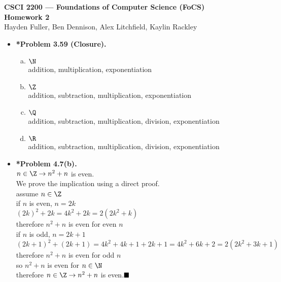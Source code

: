 \documentclass[11pt]{article}
\def\imp{\rightarrow}
\begin{document}
\thispagestyle{empty}   %

\begin{center}
\large
\textbf{CSCI 2200 --- Foundations of Computer Science (FoCS) \\
Homework 2}
\\Hayden Fuller, Ben Dennison, Alex Litchfield, Kaylin Rackley
\end{center}

\begin{itemize}

\item \textbf{*Problem 3.59 (Closure).} 
\begin{enumerate}[(a)]
\item $\N$
\\addition, multiplication, exponentiation
\item $\Z$
\\addition, subtraction, multiplication, exponentiation
\item $\Q$
\\addition, subtraction, multiplication, division, exponentiation
\item $\R$
\\addition, subtraction, multiplication, division, exponentiation
\end{enumerate}

\vspace{0.1in}

\item \textbf{*Problem 4.7(b).} 
\\$n \in \Z \imp n^2+n$ is even.
\\We prove the implication using a direct proof.
\\assume $n \in \Z$
\\if $n$ is even, $n=2k$
\\$(2k)^2+2k=4k^2+2k=2(2k^2+k)$
\\therefore $n^2+n$ is even for even $n$
\\if $n$ is odd, $n=2k+1$
\\$(2k+1)^2+(2k+1)=4k^2+4k+1+2k+1=4k^2+6k+2=2(2k^2+3k+1)$
\\therefore $n^2+n$ is even for odd $n$
\\so $n^2+n$ is even for $n \in \N$
\\therefore $n \in \Z \imp n^2+n$ is even.$\hfill\blacksquare$

\vspace{0.1in}


\end{itemize}
\end{document}
